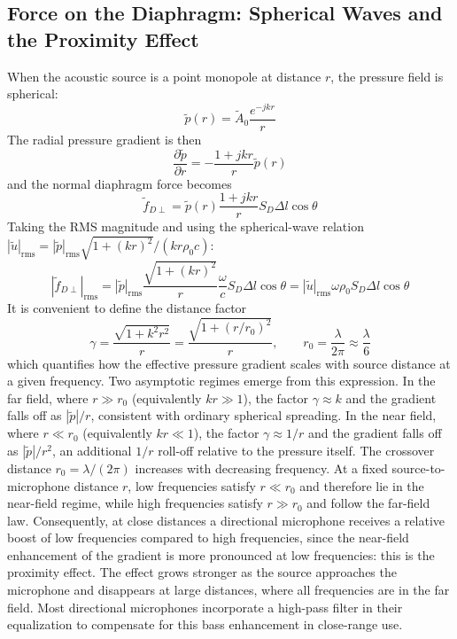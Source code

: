\subsection{Force on the Diaphragm: Spherical Waves and the Proximity Effect}

When the acoustic source is a point monopole at distance \(r\), the pressure field is spherical:
\[
\tilde{p}(r) = \tilde{A}_0 \frac{e^{-jkr}}{r}
\]
The radial pressure gradient is then
\[
\frac{\partial \tilde{p}}{\partial r} = -\frac{1+jkr}{r} \tilde{p}(r)
\]
and the normal diaphragm force becomes
\[
\tilde{f}_{D\perp} = \tilde{p}(r) \frac{1+jkr}{r} S_D \Delta l \cos\theta
\]
Taking the RMS magnitude and using the spherical-wave relation \(|\tilde{u}|_{\mathrm{rms}} = |\tilde{p}|_{\mathrm{rms}} \sqrt{1+(kr)^2} /(kr \rho_0 c)\):
\[
|\tilde{f}_{D\perp}|_{\mathrm{rms}} = |\tilde{p}|_{\mathrm{rms}} \frac{\sqrt{1+(kr)^2}}{r} \frac{\omega}{c} S_D \Delta l \cos\theta = |\tilde{u}|_{\mathrm{rms}} \omega \rho_0 S_D \Delta l \cos\theta
\]
It is convenient to define the distance factor
\[
\gamma = \frac{\sqrt{1+k^2r^2}}{r} = \frac{\sqrt{1+(r/r_0)^2}}{r}, \qquad r_0 = \frac{\lambda}{2\pi} \approx \frac{\lambda}{6}
\]
which quantifies how the effective pressure gradient scales with source distance at a given frequency.
Two asymptotic regimes emerge from this expression.
In the far field, where \(r \gg r_0\) (equivalently \(kr \gg 1\)), the factor \(\gamma \approx k\) and the gradient falls off as \(|\tilde{p}|/r\), consistent with ordinary spherical spreading.
In the near field, where \(r \ll r_0\) (equivalently \(kr \ll 1\)), the factor \(\gamma \approx 1/r\) and the gradient falls off as \(|\tilde{p}|/r^2\), an additional \(1/r\) roll-off relative to the pressure itself.
The crossover distance \(r_0 = \lambda/(2\pi)\) increases with decreasing frequency.
At a fixed source-to-microphone distance \(r\), low frequencies satisfy \(r \ll r_0\) and therefore lie in the near-field regime, while high frequencies satisfy \(r \gg r_0\) and follow the far-field law.
Consequently, at close distances a directional microphone receives a relative boost of low frequencies compared to high frequencies, since the near-field enhancement of the gradient is more pronounced at low frequencies: this is the proximity effect.
The effect grows stronger as the source approaches the microphone and disappears at large distances, where all frequencies are in the far field.
Most directional microphones incorporate a high-pass filter in their equalization to compensate for this bass enhancement in close-range use.


